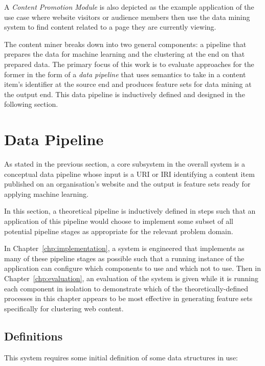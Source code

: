 A \emph{Content Promotion Module} is also depicted as the example application
of the use case where website visitors or audience members then use the
data mining system to find content related to a page they are currently viewing.

The content miner breaks down into two general components: a pipeline
that prepares the data for machine learning and the clustering at the
end on that prepared data. The primary focus of this work is to
evaluate approaches for the former in the form of a
\emph{data pipeline} that uses semantics to take in a content item's
identifier at the source end and produces feature sets for data mining
at the output end. This data pipeline is inductively defined and
designed in the following section.

\section{Data Pipeline}
\label{sec:design-pipeline}

As stated in the previous section, a core subsystem in the overall
system is a conceptual data pipeline whose input is a URI or IRI
identifying a content item published on an organisation's website and
the output is feature sets ready for applying machine learning.

In this section, a theoretical pipeline is inductively defined in
steps such that an application of this pipeline would choose to
implement some subset of all potential pipeline stages as appropriate
for the relevant problem domain.

In Chapter~\ref{chp:implementation}, a system is engineered that implements
as many of these pipeline stages as possible such that a running instance of
the application can configure which components to use and which not to use.
Then in Chapter~\ref{chp:evaluation}, an evaluation of the system is given
while it is running each component in isolation to demonstrate which of the
theoretically-defined processes in this chapter appears to be most effective
in generating feature sets specifically for clustering web content.

\subsection{Definitions}

This system requires some initial definition of some data structures in use:

